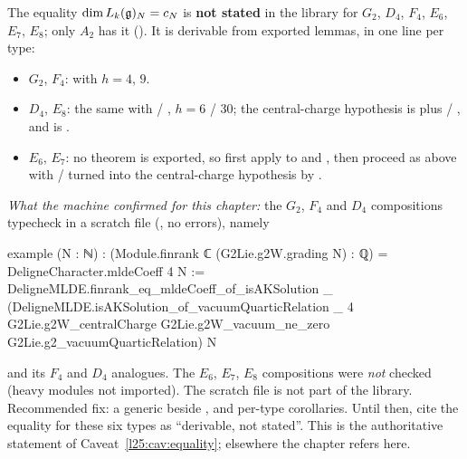 \begin{warning}[title={LEAN DEFECT: equality is not a Lean theorem for six types}]
The equality $\dim L_k(\mathfrak g)_N=c_N$ is \textbf{not stated} in the library for $G_2$, $D_4$, $F_4$, $E_6$, $E_7$,
$E_8$; only $A_2$ has it (). It is derivable from exported lemmas, in one line per type:
\begin{itemize}
\item $G_2$, $F_4$:  with $h=4$, $9$.
\item $D_4$, $E_8$: the same with  / , $h=6$ / $30$; the
  central-charge hypothesis is  plus  / , and
   is .
\item $E_6$, $E_7$: no  theorem is exported, so first apply
   to 
  and , then proceed as above with
  / turned into the central-charge hypothesis by .
\end{itemize}
\emph{What the machine confirmed for this chapter:} the $G_2$, $F_4$ and $D_4$ compositions typecheck in a scratch
file (, no errors), namely
\begin{plaincode}
example (N : ℕ) : (Module.finrank ℂ (G2Lie.g2W.grading N) : ℚ) = DeligneCharacter.mldeCoeff 4 N :=
  DeligneMLDE.finrank_eq_mldeCoeff_of_isAKSolution _
    (DeligneMLDE.isAKSolution_of_vacuumQuarticRelation _ 4 G2Lie.g2W_centralCharge
      G2Lie.g2W_vacuum_ne_zero G2Lie.g2_vacuumQuarticRelation) N
\end{plaincode}
and its $F_4$ and $D_4$ analogues. The $E_6$, $E_7$, $E_8$ compositions were \emph{not} checked (heavy modules not
imported). The scratch file is not part of the library. Recommended fix: a generic
 beside , and per-type
 corollaries. Until then, cite the equality for these six types as ``derivable, not
stated''. This is the authoritative statement of Caveat~\ref{l25:cav:equality}; elsewhere the chapter refers here.
\end{warning}

